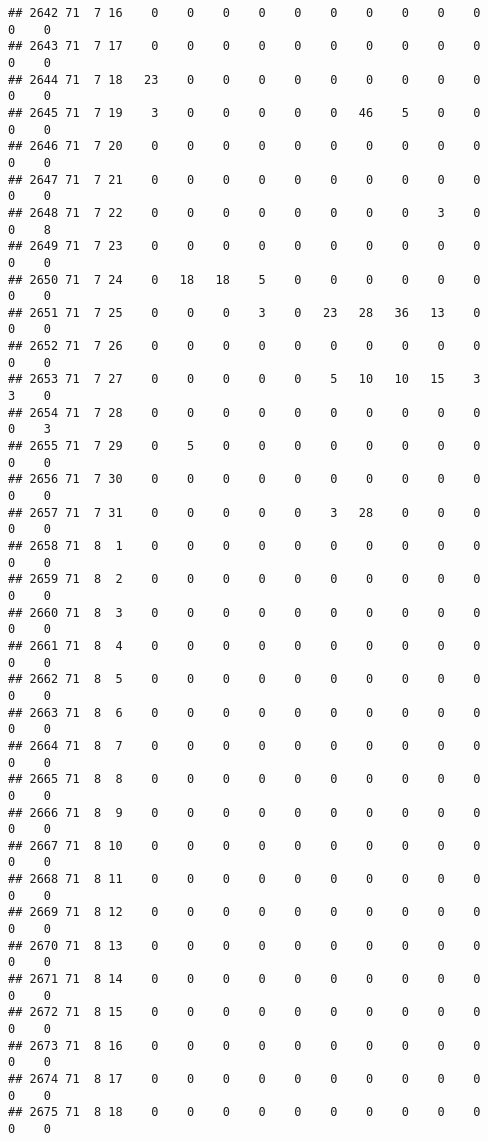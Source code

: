 \documentclass[]{article}
\begin{document}
\begin{verbatim}
## 2642 71  7 16    0    0    0    0    0    0    0    0    0    0    0    0
## 2643 71  7 17    0    0    0    0    0    0    0    0    0    0    0    0
## 2644 71  7 18   23    0    0    0    0    0    0    0    0    0    0    0
## 2645 71  7 19    3    0    0    0    0    0   46    5    0    0    0    0
## 2646 71  7 20    0    0    0    0    0    0    0    0    0    0    0    0
## 2647 71  7 21    0    0    0    0    0    0    0    0    0    0    0    0
## 2648 71  7 22    0    0    0    0    0    0    0    0    3    0    0    8
## 2649 71  7 23    0    0    0    0    0    0    0    0    0    0    0    0
## 2650 71  7 24    0   18   18    5    0    0    0    0    0    0    0    0
## 2651 71  7 25    0    0    0    3    0   23   28   36   13    0    0    0
## 2652 71  7 26    0    0    0    0    0    0    0    0    0    0    0    0
## 2653 71  7 27    0    0    0    0    0    5   10   10   15    3    3    0
## 2654 71  7 28    0    0    0    0    0    0    0    0    0    0    0    3
## 2655 71  7 29    0    5    0    0    0    0    0    0    0    0    0    0
## 2656 71  7 30    0    0    0    0    0    0    0    0    0    0    0    0
## 2657 71  7 31    0    0    0    0    0    3   28    0    0    0    0    0
## 2658 71  8  1    0    0    0    0    0    0    0    0    0    0    0    0
## 2659 71  8  2    0    0    0    0    0    0    0    0    0    0    0    0
## 2660 71  8  3    0    0    0    0    0    0    0    0    0    0    0    0
## 2661 71  8  4    0    0    0    0    0    0    0    0    0    0    0    0
## 2662 71  8  5    0    0    0    0    0    0    0    0    0    0    0    0
## 2663 71  8  6    0    0    0    0    0    0    0    0    0    0    0    0
## 2664 71  8  7    0    0    0    0    0    0    0    0    0    0    0    0
## 2665 71  8  8    0    0    0    0    0    0    0    0    0    0    0    0
## 2666 71  8  9    0    0    0    0    0    0    0    0    0    0    0    0
## 2667 71  8 10    0    0    0    0    0    0    0    0    0    0    0    0
## 2668 71  8 11    0    0    0    0    0    0    0    0    0    0    0    0
## 2669 71  8 12    0    0    0    0    0    0    0    0    0    0    0    0
## 2670 71  8 13    0    0    0    0    0    0    0    0    0    0    0    0
## 2671 71  8 14    0    0    0    0    0    0    0    0    0    0    0    0
## 2672 71  8 15    0    0    0    0    0    0    0    0    0    0    0    0
## 2673 71  8 16    0    0    0    0    0    0    0    0    0    0    0    0
## 2674 71  8 17    0    0    0    0    0    0    0    0    0    0    0    0
## 2675 71  8 18    0    0    0    0    0    0    0    0    0    0    0    0

\end{verbatim}
\end{document}
